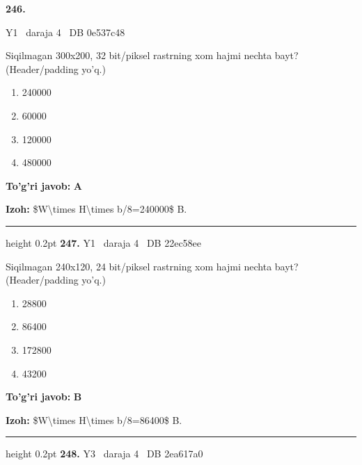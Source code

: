 \documentclass[10pt,a4paper,oneside]{article}
\begin{document}
\hypertarget{q246}{\textbf{\color{ink}246.}}  {\color{muted}\scriptsize Y1 \textbullet\ daraja 4 \textbullet\ DB 0e537c48}
\par
Siqilmagan 300x200, 32 bit/piksel rastrning xom hajmi nechta bayt? (Header/padding yo'q.)
\begin{enumerate}[label=\Alph*),leftmargin=9mm]
\item 240000
\item 60000
\item 120000
\item 480000
\end{enumerate}
\begin{tcolorbox}[enhanced,breakable,colback=teal!4,colframe=teal!45!black,boxrule=0.45pt,arc=1.2mm,left=2.8mm,right=2.8mm,top=2mm,bottom=2mm,before skip=2mm,after skip=2mm]
\textbf{\color{teal}To'g'ri javob:} \textbf{A}
\par\smallskip
\textbf{Izoh:} \$W\textbackslash{}times H\textbackslash{}times b/8=240000\$ B.
\end{tcolorbox}
\vspace{2mm}\hrule height 0.2pt \vspace{4mm}
\hypertarget{q247}{\textbf{\color{ink}247.}}  {\color{muted}\scriptsize Y1 \textbullet\ daraja 4 \textbullet\ DB 22ec58ee}
\par
Siqilmagan 240x120, 24 bit/piksel rastrning xom hajmi nechta bayt? (Header/padding yo'q.)
\begin{enumerate}[label=\Alph*),leftmargin=9mm]
\item 28800
\item 86400
\item 172800
\item 43200
\end{enumerate}
\begin{tcolorbox}[enhanced,breakable,colback=teal!4,colframe=teal!45!black,boxrule=0.45pt,arc=1.2mm,left=2.8mm,right=2.8mm,top=2mm,bottom=2mm,before skip=2mm,after skip=2mm]
\textbf{\color{teal}To'g'ri javob:} \textbf{B}
\par\smallskip
\textbf{Izoh:} \$W\textbackslash{}times H\textbackslash{}times b/8=86400\$ B.
\end{tcolorbox}
\vspace{2mm}\hrule height 0.2pt \vspace{4mm}
\hypertarget{q248}{\textbf{\color{ink}248.}}  {\color{muted}\scriptsize Y3 \textbullet\ daraja 4 \textbullet\ DB 2ea617a0}
\par
\end{document}

